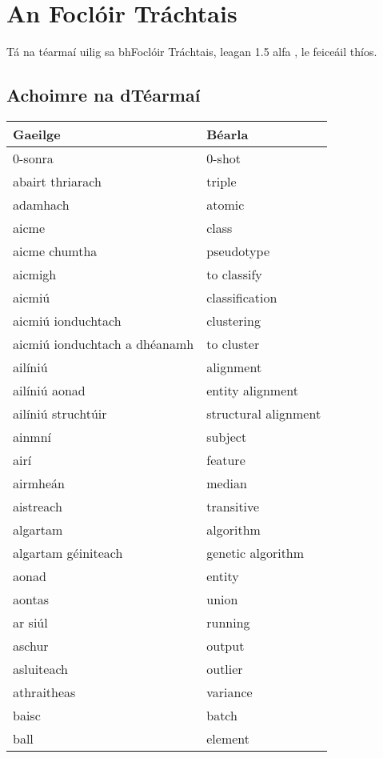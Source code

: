 \section{An Foclóir Tráchtais} \label{focloir-trachtais-content}
Tá na téarmaí uilig sa bhFoclóir Tráchtais, leagan 1.5 alfa \cite{focloir-trachtais}, le feiceáil thíos.

\subsection{Achoimre na dTéarmaí}
\begin{longtable}{|l|l|}
	\hline
		\textbf{Gaeilge} & \textbf{Béarla}\\ \hline 
		0-sonra&0-shot\\ \hline 
		abairt thriarach&triple\\ \hline 
		adamhach&atomic\\ \hline 
		aicme&class\\ \hline 
		aicme chumtha&pseudotype\\ \hline 
		aicmigh&to classify\\ \hline 
		aicmiú&classification\\ \hline 
		aicmiú ionduchtach&clustering\\ \hline 
		aicmiú ionduchtach a dhéanamh&to cluster\\ \hline 
		ailíniú&alignment\\ \hline 
		ailíniú aonad&entity alignment\\ \hline 
		ailíniú struchtúir&structural alignment\\ \hline 
		ainmní&subject\\ \hline 
		airí&feature\\ \hline 
		airmheán&median\\ \hline 
		aistreach&transitive\\ \hline 
		algartam&algorithm\\ \hline 
		algartam géiniteach&genetic algorithm\\ \hline 
		aonad&entity\\ \hline 
		aontas&union\\ \hline 
		ar siúl&running\\ \hline 
		aschur&output\\ \hline 
		asluiteach&outlier\\ \hline 
		athraitheas&variance\\ \hline 
		baisc&batch\\ \hline 
		ball&element\\ \hline 

\end{longtable}
